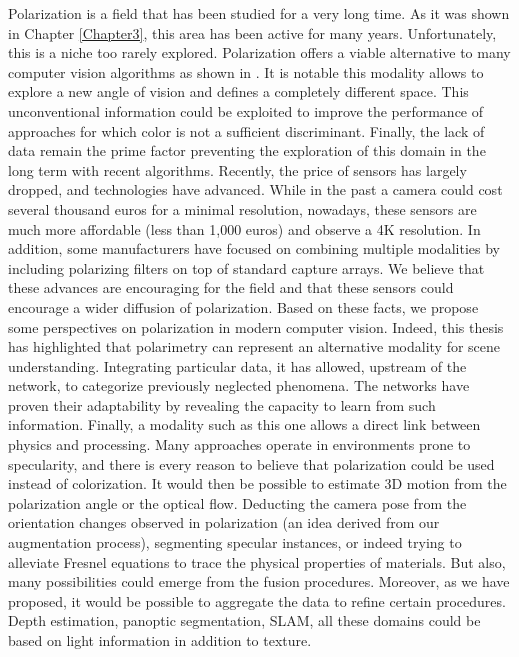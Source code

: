 Polarization is a field that has been studied for a very long time. As it was shown in Chapter \ref{Chapter3}, this area has been active for many years. Unfortunately, this is a niche too rarely explored.
Polarization offers a viable alternative to many computer vision algorithms as shown in \cite{morel2005polarization,morel2006active,morel2007catadioptric,cui2017polarimetric,berger2017depth,rastgoo2018attitude,blin2019road,blin2019adapted,blin2020new}.
It is notable this modality allows to explore a new angle of vision and defines a completely different space. This unconventional information could be exploited to improve the performance of approaches for which color is not a sufficient discriminant. Finally, the lack of data remain the prime factor preventing the exploration of this domain in the long term with recent algorithms.
Recently, the price of sensors has largely dropped, and technologies have advanced. While in the past a camera could cost several thousand euros for a minimal resolution, nowadays, these sensors are much more affordable (less than 1,000 euros) and observe a 4K resolution. In addition, some manufacturers have focused on combining multiple modalities by including polarizing filters on top of standard capture arrays. We believe that these advances are encouraging for the field and that these sensors could encourage a wider diffusion of polarization. 
Based on these facts, we propose some perspectives on polarization in modern computer vision.
Indeed, this thesis has highlighted that polarimetry can represent an alternative modality for scene understanding. Integrating particular data, it has allowed, upstream of the network, to categorize previously neglected phenomena. The networks have proven their adaptability by revealing the capacity to learn from such information. Finally, a modality such as this one allows a direct link between physics and processing. Many approaches operate in environments prone to specularity, and there is every reason to believe that polarization could be used instead of colorization. It would then be possible to estimate 3D motion from the polarization angle or the optical flow. Deducting the camera pose from the orientation changes observed in polarization (an idea derived from our augmentation process), segmenting specular instances, or indeed trying to alleviate Fresnel equations to trace the physical properties of materials. But also, many possibilities could emerge from the fusion procedures. Moreover, as we have proposed, it would be possible to aggregate the data to refine certain procedures. Depth estimation, panoptic segmentation, SLAM, all these domains could be based on light information in addition to texture. 

